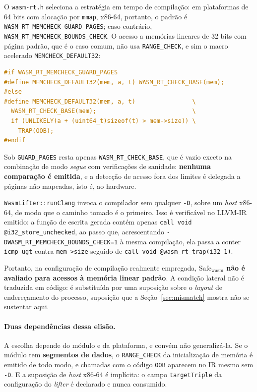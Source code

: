 \documentclass[11pt,a4paper]{article}
\theoremstyle{definition}
\newcommand{\Safe}{\mathrm{Safe}}
\newcommand{\wasm}{\mathrm{wasm}}
\newcommand{\code}[1]{\texttt{#1}}
\begin{document}
O \code{wasm-rt.h} seleciona a estratégia em tempo de compilação: em plataformas
de 64 bits com alocação por \code{mmap}, x86-64, portanto, o padrão é
\code{WASM\_RT\_MEMCHECK\_GUARD\_PAGES}; caso contrário,
\code{WASM\_RT\_MEMCHECK\_BOUNDS\_CHECK}. O acesso a memórias lineares de 32 bits
com página padrão, que é o caso comum, não usa \code{RANGE\_CHECK}, e sim o macro
acelerado \code{MEMCHECK\_DEFAULT32}:

\begin{lstlisting}[language=C]
#if WASM_RT_MEMCHECK_GUARD_PAGES
#define MEMCHECK_DEFAULT32(mem, a, t) WASM_RT_CHECK_BASE(mem);
#else
#define MEMCHECK_DEFAULT32(mem, a, t)                \
  WASM_RT_CHECK_BASE(mem);                           \
  if (UNLIKELY(a + (uint64_t)sizeof(t) > mem->size)) \
    TRAP(OOB);
#endif
\end{lstlisting}

Sob \code{GUARD\_PAGES} resta apenas \code{WASM\_RT\_CHECK\_BASE}, que é vazio
exceto na combinação de modo \emph{segue} com verificações de sanidade:
\textbf{nenhuma comparação é emitida}, e a detecção de acesso fora dos limites é
delegada a páginas não mapeadas, isto é, ao hardware.

\code{WasmLifter::runClang} invoca o compilador sem qualquer \code{-D}, sobre um
\emph{host} x86-64, de modo que o caminho tomado é o primeiro. Isso é verificável
no LLVM-IR emitido: a função de escrita gerada contém apenas
\code{call void @i32\_store\_unchecked}, ao passo que, acrescentando
\code{-DWASM\_RT\_MEMCHECK\_BOUNDS\_CHECK=1} à mesma compilação, ela passa a
conter \code{icmp ugt} contra \code{mem->size} seguido de
\code{call void @wasm\_rt\_trap(i32 1)}.

Portanto, na configuração de compilação realmente empregada,
\textbf{$\Safe_{\wasm}$ não é avaliado para acessos à memória linear padrão}. A
condição lateral não é traduzida em código: é substituída por uma suposição sobre
o \emph{layout} de endereçamento do processo, suposição que a
Seção~\ref{sec:mismatch} mostra não se sustentar aqui.

\paragraph{Duas dependências dessa elisão.}
A escolha depende do módulo e da plataforma, e convém não generalizá-la. Se o
módulo tem \textbf{segmentos de dados}, o \code{RANGE\_CHECK} da inicialização de
memória é emitido de todo modo, e chamadas com o código \code{OOB} aparecem no IR
mesmo sem \code{-D}. E a suposição de \emph{host} x86-64 é implícita: o campo
\code{targetTriple} da configuração do \emph{lifter} é declarado e nunca
consumido.
\end{document}
